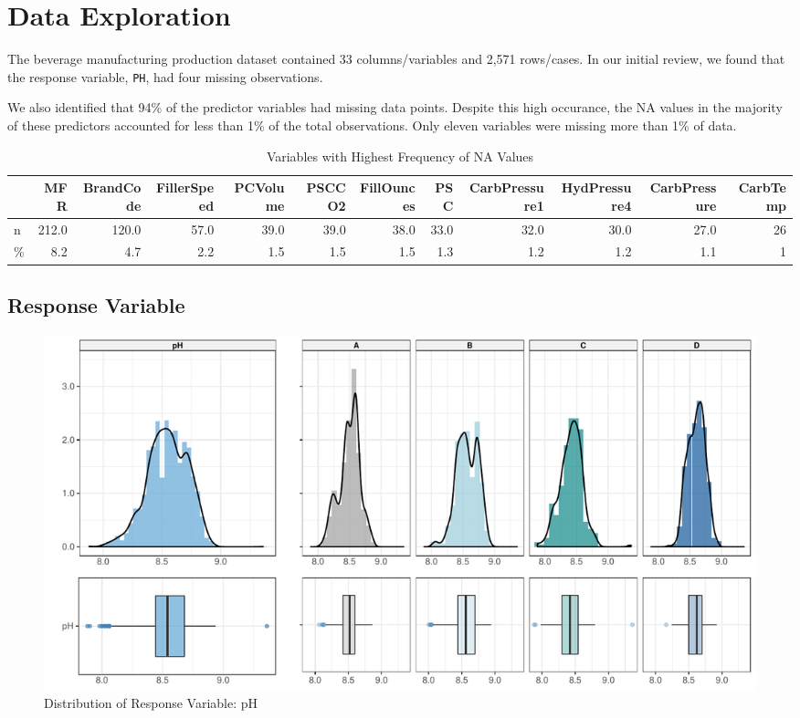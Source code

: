 \documentclass[]{report}
\begin{document}
\hypertarget{data-exploration}{%
\chapter{Data Exploration}\label{data-exploration}}

The beverage manufacturing production dataset contained 33
columns/variables and 2,571 rows/cases. In our initial review, we found
that the response variable, \texttt{PH}, had four missing observations.

We also identified that 94\% of the predictor variables had missing data
points. Despite this high occurance, the NA values in the majority of
these predictors accounted for less than 1\% of the total observations.
Only eleven variables were missing more than 1\% of data.

\begin{table}[H]

\caption{\label{tab:unnamed-chunk-2}Variables with Highest Frequency of NA Values}
\centering
\fontsize{8}{10}\selectfont
\begin{tabular}{lrrrrrrrrrrr}
\toprule
\textbf{ } & \textbf{MFR} & \textbf{BrandCode} & \textbf{FillerSpeed} & \textbf{PCVolume} & \textbf{PSCCO2} & \textbf{FillOunces} & \textbf{PSC} & \textbf{CarbPressure1} & \textbf{HydPressure4} & \textbf{CarbPressure} & \textbf{CarbTemp}\\
\midrule
\rowcolor{gray!6}  n & 212.0 & 120.0 & 57.0 & 39.0 & 39.0 & 38.0 & 33.0 & 32.0 & 30.0 & 27.0 & 26\\
\% & 8.2 & 4.7 & 2.2 & 1.5 & 1.5 & 1.5 & 1.3 & 1.2 & 1.2 & 1.1 & 1\\
\bottomrule
\end{tabular}
\end{table}

\hypertarget{response-variable}{%
\section{Response Variable}\label{response-variable}}

\begin{figure}

\hfill{}\includegraphics[width=1\textwidth]{Proj2-JM_files/figure-latex/unnamed-chunk-3-1} 

\caption{Distribution of Response Variable: pH}\label{fig:unnamed-chunk-3}
\end{figure}
\end{document}
